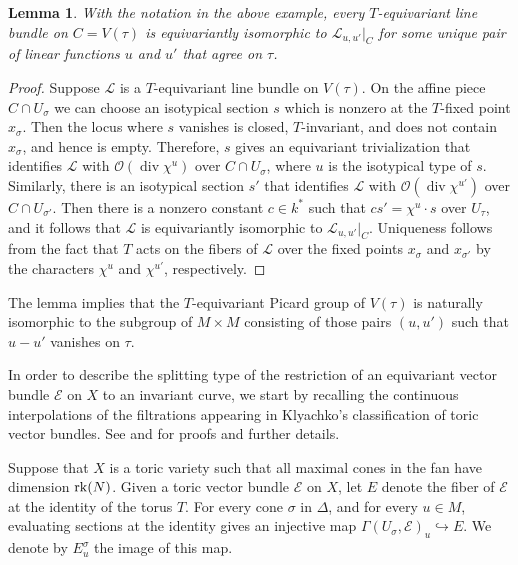 \documentclass[12pt]{amsart}
\newtheorem{lemma}{Lemma}[section]
\theoremstyle{definition}
\theoremstyle{remark}
\begin{document}
\begin{lemma} \label{T line bundles}
With the notation in the above example, every $T$-equivariant line
bundle on $C=V(\tau)$ is equivariantly isomorphic to
${\mathcal{L}}_{u,u'}\vert_C$ for some unique pair of linear functions $u$ and
$u'$ that agree on $\tau$.
\end{lemma}

\begin{proof}
Suppose ${\mathcal{L}}$ is a $T$-equivariant line bundle on $V(\tau)$.  On the
affine piece $C \cap U_\sigma$ we can choose an isotypical section
$s$ which is nonzero at the $T$-fixed point $x_\sigma$. Then the
locus where $s$ vanishes is closed, $T$-invariant, and does not
contain $x_\sigma$, and hence is empty. Therefore, $s$ gives an
equivariant trivialization that identifies ${\mathcal{L}}$ with ${\mathcal{O}}(\operatorname{div}
\chi^u)$ over $C \cap U_\sigma$, where $u$ is the isotypical type of
$s$. Similarly, there is an isotypical section $s'$ that identifies
${\mathcal{L}}$ with ${\mathcal{O}}(\operatorname{div} \chi^{u'})$ over $C \cap U_{\sigma'}$. Then
there is a nonzero constant $c \in k^*$ such that $cs' = \chi^u
\cdot s$ over $U_\tau$, and it follows that ${\mathcal{L}}$ is equivariantly
isomorphic to ${\mathcal{L}}_{u, u'}\vert_C$.  Uniqueness follows from the
fact that $T$ acts on the fibers of ${\mathcal{L}}$ over the fixed points
$x_\sigma$ and $x_{\sigma'}$ by the characters $\chi^u$ and
$\chi^{u'}$, respectively.
\end{proof}

\noindent  The lemma implies that the $T$-equivariant Picard group
of $V(\tau)$ is naturally isomorphic to the subgroup of $M \times M$
consisting of those pairs $(u,u')$ such that $u - u'$ vanishes on
$\tau$.

In order to describe the splitting type of the restriction of an
equivariant vector bundle ${\mathcal{E}}$ on $X$ to an invariant curve, we
start by recalling the continuous interpolations of the filtrations
appearing in Klyachko's classification of toric vector bundles.
 See \cite{Klyachko} and \cite[Section~2]{Payne2} for proofs and further details.

Suppose that $X$ is a toric variety such that all maximal cones in
the fan have dimension ${\rm rk}(N)$. Given a toric vector bundle
${\mathcal{E}}$ on $X$, let $E$ denote the fiber of ${\mathcal{E}}$ at the identity of
the torus $T$. For every cone $\sigma$ in $\Delta$, and for every
$u\in M$, evaluating sections at the identity gives an injective map
$\Gamma(U_{\sigma},{\mathcal{E}})_u\hookrightarrow E$. We denote by
$E^{\sigma}_u$ the image of this map.
\end{document}

